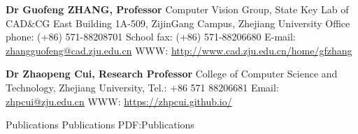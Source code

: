 \documentclass[letterpaper,MMMyyyy,nonstopmode]{simpleresumecv}
\begin{document}
\begin{Body}
\Gap
\BulletItem
\textbf{Dr Guofeng ZHANG, Professor}
\newline
Computer Vision Group, State Key Lab of CAD\&CG
\newline
East Building 1A-509, ZijinGang Campus, Zhejiang University
\newline
Office phone: (+86) 571-88208701
\newline
School fax: (+86) 571-88206680
\newline
E-mail: \url{zhangguofeng@cad.zju.edu.cn}
\newline
WWW: \url{http://www.cad.zju.edu.cn/home/gfzhang}

\Gap
\BulletItem
\textbf{Dr Zhaopeng Cui, Research Professor}
\newline
College of Computer Science and Technology,
\newline
Zhejiang University,
\newline
Tel.: +86 571 88206681
\newline
Email: \url{zhpcui@zju.edu.cn}
\newline
WWW: \url{https://zhpcui.github.io/}



\Section
{Publications}
{Publications}
{PDF:Publications}

\begingroup
\renewcommand{\MaxNumberedItem}{[88]}




\endgroup


\end{Body}


\UseNoteFont%
\null\hfill%
\end{document}
